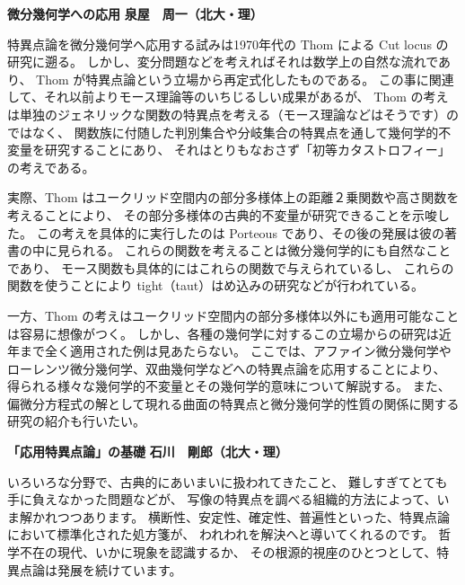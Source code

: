 \documentclass[uplatex,dvipdfmx]{jlreq}
\begin{document}
\newpage

\noindent
{\large\bfseries 微分幾何学への応用}
\hfill
{\large\bfseries 泉屋　周一（北大・理）}

\medskip

特異点論を微分幾何学へ応用する試みは1970年代の Thom による Cut locus の研究に遡る。
しかし、変分問題などを考えればそれは数学上の自然な流れであり、
Thom が特異点論という立場から再定式化したものである。
この事に関連して、それ以前よりモース理論等のいちじるしい成果があるが、
Thom の考えは単独のジェネリックな関数の特異点を考える（モース理論などはそうです）のではなく、
関数族に付随した判別集合や分岐集合の特異点を通して幾何学的不変量を研究することにあり、
それはとりもなおさず「初等カタストロフィー」の考えである。

実際、Thom はユークリッド空間内の部分多様体上の距離２乗関数や高さ関数を考えることにより、
その部分多様体の古典的不変量が研究できることを示唆した。
この考えを具体的に実行したのは Porteous であり、その後の発展は彼の著書の中に見られる。
これらの関数を考えることは微分幾何学的にも自然なことであり、
モース関数も具体的にはこれらの関数で与えられているし、
これらの関数を使うことにより tight（taut）はめ込みの研究などが行われている。

一方、Thom の考えはユークリッド空間内の部分多様体以外にも適用可能なことは容易に想像がつく。
しかし、各種の幾何学に対するこの立場からの研究は近年まで全く適用された例は見あたらない。
ここでは、アファイン微分幾何学やローレンツ微分幾何学、双曲幾何学などへの特異点論を応用することにより、
得られる様々な幾何学的不変量とその幾何学的意味について解説する。
また、偏微分方程式の解として現れる曲面の特異点と微分幾何学的性質の関係に関する
研究の紹介も行いたい。

\newpage

\noindent
{\large\bfseries 「応用特異点論」の基礎}
\hfill
{\large\bfseries 石川　剛郎（北大・理）}

\medskip

いろいろな分野で、古典的にあいまいに扱われてきたこと、
難しすぎてとても手に負えなかった問題などが、
写像の特異点を調べる組織的方法によって、いま解かれつつあります。
横断性、安定性、確定性、普遍性といった、特異点論において標準化された処方箋が、
われわれを解決へと導いてくれるのです。
哲学不在の現代、いかに現象を認識するか、
その根源的視座のひとつとして、特異点論は発展を続けています。
\end{document}
